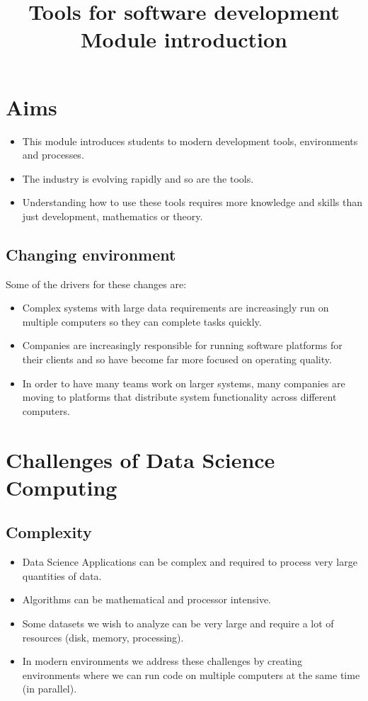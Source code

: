 \documentclass[slides]{pgnotes}
\title{Tools for software development\\Module introduction}
\begin{document}
\maketitle

\tableofcontents

\section{Aims}

\begin{itemize}
  \item This module introduces students to modern development tools, environments and processes.
  \item The industry is evolving rapidly and so are the tools.
  \item Understanding how to use these tools requires more knowledge and skills than just development, mathematics or theory.
\end{itemize}

\subsection{Changing environment}

Some of the drivers for these changes are:

\begin{itemize}
\item Complex systems with large data requirements are increasingly run on multiple computers so they can complete tasks quickly.
\item Companies are increasingly responsible for running software platforms for their clients and so have become far more focused on operating quality.
\item In order to have many teams work on larger systems, many companies are moving to platforms that distribute system functionality across different computers. 
\end{itemize}

\section{Challenges of Data Science Computing}

\subsection{Complexity}

\begin{itemize}
\item Data Science Applications can be complex and required to process very large quantities of data.
\item Algorithms can be mathematical and processor intensive.
\item Some datasets we wish to analyze can be very large and require a lot of resources (disk, memory, processing).
\item In modern environments we address these challenges by creating environments where we can run code on multiple computers at the same time (in parallel).
\end{itemize}
\end{document}
